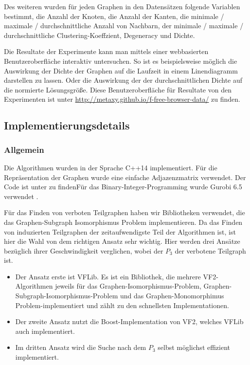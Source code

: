 \documentclass[12pt,a4paper,onecolumn,oneside,titlepage]{article}
\begin{document}
Des weiteren wurden für jeden Graphen in den Datensätzen folgende Variablen bestimmt, die Anzahl der Knoten, die Anzahl der Kanten, die minimale / maximale / durchschnittliche Anzahl von Nachbarn, der minimale / maximale / durchschnittliche Clustering-Koeffzient, Degeneracy und Dichte.

Die Resultate der Experimente kann man mittels einer webbasierten Benutzeroberfläche interaktiv untersuchen. So ist es beispielsweise möglich  die Auswirkung der Dichte der Graphen auf die Laufzeit in einem Linendiagramm darstellen zu lassen. Oder die Auswirkung der der durchschnittlichen Dichte auf die normierte Lösungsgröße. Diese Benutzeroberfläche für Resultate von den Experimenten ist unter  \url{http://metaxy.github.io/f-free-browser-data/} zu finden.

\subsection{Implementierungsdetails}

\label{sec:implementation}
\subsubsection{Allgemein}
Die Algorithmen wurden in der Sprache C++14 implementiert. Für die Repräsentation der Graphen wurde eine einfache Adjazenzmatrix verwendet. Der Code ist unter \cite{Code} zu findenFür das Binary-Integer-Programming wurde Gurobi 6.5 verwendet \cite{gurobi}.

Für das Finden von verboten Teilgraphen haben wir Bibliotheken verwendet, die das Graphen-Subgraph Isomorphismus Problem implementieren.
Da das Finden von induzierten Teilgraphen der zeitaufwendigste Teil der Algorithmen ist, ist hier die Wahl von dem richtigen Ansatz sehr wichtig. Hier werden drei Ansätze bezüglich ihrer Geschwindigkeit verglichen, wobei der $P_3$ der verbotene Teilgraph ist. 

\begin{itemize}
\item Der Ansatz erste ist VFLib. Es ist ein Bibliothek, die mehrere VF2-Algorithmen \cite{Cordella04} jeweils für das Graphen-Isomorphismus-Problem, Graphen-Subgraph-Isomorphismus-Problem und das Graphen-Monomorphimus Problem-implementiert und zählt zu den schnellsten Implementationen.

\item Der zweite Ansatz nutzt die Boost-Implementation von VF2, welches VFLib auch implementiert.

\item Im dritten Ansatz wird die Suche nach dem $P_3$ selbst möglichst effizient implementiert. 
\end{itemize}
\end{document}
